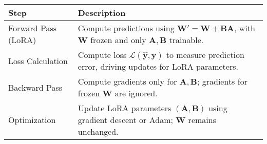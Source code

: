 \begin{center}
\begin{tabular}{|l|p{10cm}|}
\hline
\textbf{Step} & \textbf{Description} \\
\hline
Forward Pass (LoRA) & Compute predictions using $\mathbf{W}' = \mathbf{W} + \mathbf{B}\mathbf{A}$, with $\mathbf{W}$ frozen and only $\mathbf{A}, \mathbf{B}$ trainable. \\
\hline
Loss Calculation & Compute loss $\mathcal{L}(\hat{\mathbf{y}}, \mathbf{y})$ to measure prediction error, driving updates for LoRA parameters. \\
\hline
Backward Pass & Compute gradients only for $\mathbf{A}, \mathbf{B}$; gradients for frozen $\mathbf{W}$ are ignored. \\
\hline
Optimization & Update LoRA parameters $(\mathbf{A}, \mathbf{B})$ using gradient descent or Adam; $\mathbf{W}$ remains unchanged. \\
\hline
\end{tabular}
\end{center}



